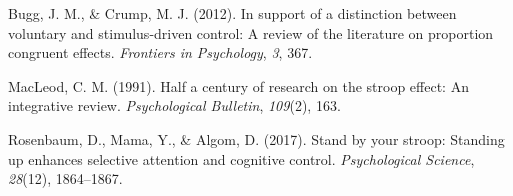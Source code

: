 \documentclass[
  man]{apa6}
\newlength{\cslhangindent}
\newlength{\cslentryspacingunit} %
\newenvironment{CSLReferences}[2] %
 {%
  \setlength{\parindent}{0pt}
  \ifodd #1
  \let\oldpar\par
  \def\par{\hangindent=\cslhangindent\oldpar}
  \fi
  \setlength{\parskip}{#2\cslentryspacingunit}
 }%
 {}
\begin{document}
\begingroup
\setlength{\parindent}{-0.5in}
\setlength{\leftskip}{0.5in}

\hypertarget{refs}{}
\begin{CSLReferences}{1}{0}
\leavevmode{}%
Bugg, J. M., \& Crump, M. J. (2012). In support of a distinction between voluntary and stimulus-driven control: A review of the literature on proportion congruent effects. \emph{Frontiers in Psychology}, \emph{3}, 367.

\leavevmode{}%
MacLeod, C. M. (1991). Half a century of research on the stroop effect: An integrative review. \emph{Psychological Bulletin}, \emph{109}(2), 163.

\leavevmode{}%
Rosenbaum, D., Mama, Y., \& Algom, D. (2017). Stand by your stroop: Standing up enhances selective attention and cognitive control. \emph{Psychological Science}, \emph{28}(12), 1864--1867.

\end{CSLReferences}

\endgroup


\clearpage
\renewcommand{\listfigurename}{Figure captions}
\end{document}
